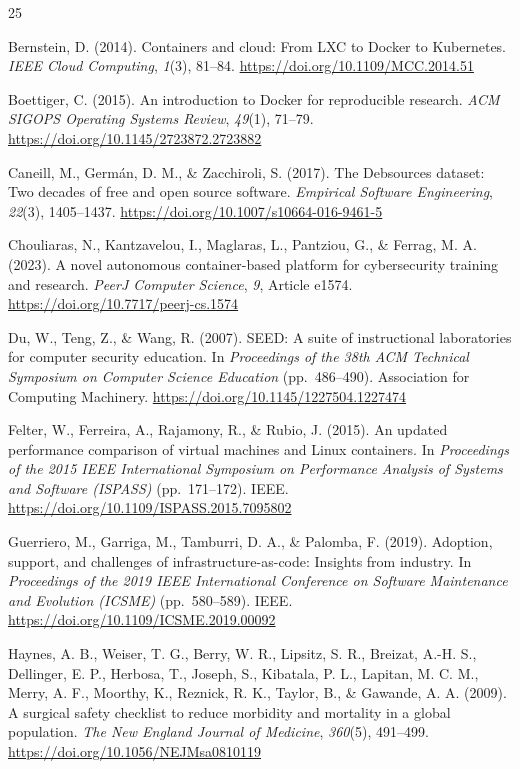 \documentclass[3p,twocolumn,authoryear]{elsarticle}
\begin{document}
\begin{thebibliography}{25}
\footnotesize

Bernstein, D. (2014). Containers and cloud: From LXC to Docker to
Kubernetes. \textit{IEEE Cloud Computing}, \textit{1}(3), 81--84.
\url{https://doi.org/10.1109/MCC.2014.51}

Boettiger, C. (2015). An introduction to Docker for reproducible
research. \textit{ACM SIGOPS Operating Systems Review}, \textit{49}(1),
71--79. \url{https://doi.org/10.1145/2723872.2723882}

Caneill, M., Germ\'an, D. M., \& Zacchiroli, S. (2017). The Debsources
dataset: Two decades of free and open source software.
\textit{Empirical Software Engineering}, \textit{22}(3), 1405--1437.
\url{https://doi.org/10.1007/s10664-016-9461-5}

Chouliaras, N., Kantzavelou, I., Maglaras, L., Pantziou, G., \& Ferrag,
M. A. (2023). A novel autonomous container-based platform for
cybersecurity training and research. \textit{PeerJ Computer Science},
\textit{9}, Article e1574. \url{https://doi.org/10.7717/peerj-cs.1574}

Du, W., Teng, Z., \& Wang, R. (2007). SEED: A suite of instructional
laboratories for computer security education. In \textit{Proceedings of
the 38th ACM Technical Symposium on Computer Science Education}
(pp.~486--490). Association for Computing Machinery.
\url{https://doi.org/10.1145/1227504.1227474}

Felter, W., Ferreira, A., Rajamony, R., \& Rubio, J. (2015). An updated
performance comparison of virtual machines and Linux containers. In
\textit{Proceedings of the 2015 IEEE International Symposium on
Performance Analysis of Systems and Software (ISPASS)} (pp.~171--172).
IEEE. \url{https://doi.org/10.1109/ISPASS.2015.7095802}

Guerriero, M., Garriga, M., Tamburri, D. A., \& Palomba, F. (2019).
Adoption, support, and challenges of infrastructure-as-code: Insights
from industry. In \textit{Proceedings of the 2019 IEEE International
Conference on Software Maintenance and Evolution (ICSME)}
(pp.~580--589). IEEE. \url{https://doi.org/10.1109/ICSME.2019.00092}

Haynes, A. B., Weiser, T. G., Berry, W. R., Lipsitz, S. R., Breizat,
A.-H. S., Dellinger, E. P., Herbosa, T., Joseph, S., Kibatala, P. L.,
Lapitan, M. C. M., Merry, A. F., Moorthy, K., Reznick, R. K., Taylor,
B., \& Gawande, A. A. (2009). A surgical safety checklist to reduce
morbidity and mortality in a global population. \textit{The New
England Journal of Medicine}, \textit{360}(5), 491--499.
\url{https://doi.org/10.1056/NEJMsa0810119}


\end{thebibliography}
\end{document}
